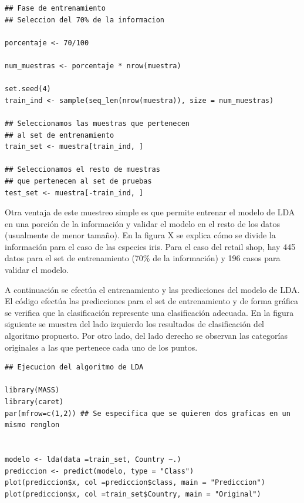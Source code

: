 \documentclass[letterpaper,12pt, spanish, oneside]{book} %
\begin{document}
\begin{lstlisting}
## Fase de entrenamiento
## Seleccion del 70% de la informacion

porcentaje <- 70/100

num_muestras <- porcentaje * nrow(muestra)

set.seed(4)
train_ind <- sample(seq_len(nrow(muestra)), size = num_muestras)

## Seleccionamos las muestras que pertenecen
## al set de entrenamiento
train_set <- muestra[train_ind, ]

## Seleccionamos el resto de muestras
## que pertenecen al set de pruebas
test_set <- muestra[-train_ind, ]
\end{lstlisting}

Otra ventaja de este muestreo simple es que permite entrenar el modelo de LDA en una porción de la información y validar el modelo en el resto de los datos (usualmente de menor tamaño). En la figura X se explica cómo se divide la información para el caso de las especies iris. Para el caso del retail shop, hay 445 datos para el set de entrenamiento (70\% de la información) y 196 casos para validar el modelo.

A continuación se efectúa el entrenamiento y las predicciones del modelo de LDA. El código efectúa las predicciones para el set de entrenamiento y de forma gráfica se verifica que la clasificación represente una clasificación adecuada. En la figura siguiente se muestra del lado izquierdo los resultados de clasificación del algoritmo propuesto. Por otro lado, del lado derecho se observan las categorías originales a las que pertenece cada uno de los puntos. 

\begin{lstlisting}
## Ejecucion del algoritmo de LDA

library(MASS)
library(caret)
par(mfrow=c(1,2)) ## Se especifica que se quieren dos graficas en un mismo renglon


modelo <- lda(data =train_set, Country ~.)
prediccion <- predict(modelo, type = "Class")
plot(prediccion$x, col =prediccion$class, main = "Prediccion")
plot(prediccion$x, col =train_set$Country, main = "Original")
\end{lstlisting}
\end{document}
